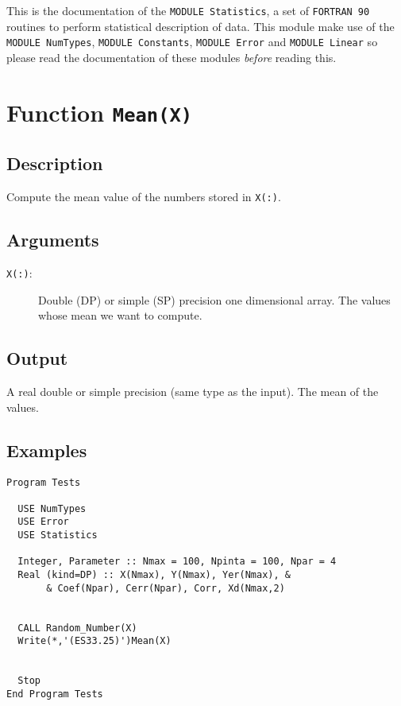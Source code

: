 This is the documentation of the \texttt{MODULE Statistics}, a set
of \texttt{FORTRAN 90} routines to perform statistical description
of data. This module make use of the \texttt{MODULE NumTypes},
\texttt{MODULE Constants}, \texttt{MODULE Error} and \texttt{MODULE
  Linear} so please read the documentation of these modules
\emph{before} reading this. 

\section{Function \texttt{Mean(X)}}

\subsection{Description}

Compute the mean value of the numbers stored in \texttt{X(:)}.

\subsection{Arguments}

\begin{description}
\item[\texttt{X(:)}:] Double (DP) or simple (SP) precision one
  dimensional array. The values  whose mean we want to compute.
\end{description}

\subsection{Output}

A real double or simple precision (same type as the input). The mean
of the values.

\subsection{Examples}

\begin{lstlisting}[emph=Mean,
                   emphstyle=\color{blue},
                   frame=trBL,
                   caption=Computing the Mean of a vector of numbers.,
                   label=mean]
Program Tests

  USE NumTypes
  USE Error
  USE Statistics

  Integer, Parameter :: Nmax = 100, Npinta = 100, Npar = 4
  Real (kind=DP) :: X(Nmax), Y(Nmax), Yer(Nmax), &
       & Coef(Npar), Cerr(Npar), Corr, Xd(Nmax,2)


  CALL Random_Number(X)
  Write(*,'(ES33.25)')Mean(X)


  Stop
End Program Tests
\end{lstlisting}



